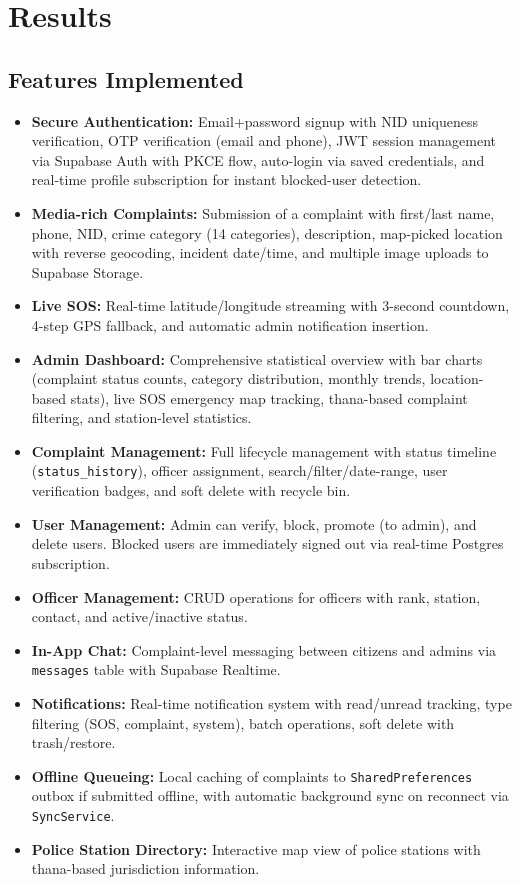 \documentclass[12pt, a4paper, twoside]{report}
\begin{document}
\chapter{Results}
\section{Features Implemented}
\begin{itemize}[label={}, itemsep=1em]
    \item \textbf{Secure Authentication:} Email+password signup with NID uniqueness verification, OTP verification (email and phone), JWT session management via Supabase Auth with PKCE flow, auto-login via saved credentials, and real-time profile subscription for instant blocked-user detection.
    \item \textbf{Media-rich Complaints:} Submission of a complaint with first/last name, phone, NID, crime category (14 categories), description, map-picked location with reverse geocoding, incident date/time, and multiple image uploads to Supabase Storage.
    \item \textbf{Live SOS:} Real-time latitude/longitude streaming with 3-second countdown, 4-step GPS fallback, and automatic admin notification insertion.
    \item \textbf{Admin Dashboard:} Comprehensive statistical overview with bar charts (complaint status counts, category distribution, monthly trends, location-based stats), live SOS emergency map tracking, thana-based complaint filtering, and station-level statistics.
    \item \textbf{Complaint Management:} Full lifecycle management with status timeline (\texttt{status\_history}), officer assignment, search/filter/date-range, user verification badges, and soft delete with recycle bin.
    \item \textbf{User Management:} Admin can verify, block, promote (to admin), and delete users. Blocked users are immediately signed out via real-time Postgres subscription.
    \item \textbf{Officer Management:} CRUD operations for officers with rank, station, contact, and active/inactive status.
    \item \textbf{In-App Chat:} Complaint-level messaging between citizens and admins via \texttt{messages} table with Supabase Realtime.
    \item \textbf{Notifications:} Real-time notification system with read/unread tracking, type filtering (SOS, complaint, system), batch operations, soft delete with trash/restore.
    \item \textbf{Offline Queueing:} Local caching of complaints to \texttt{SharedPreferences} outbox if submitted offline, with automatic background sync on reconnect via \texttt{SyncService}.
    \item \textbf{Police Station Directory:} Interactive map view of police stations with thana-based jurisdiction information.
\end{itemize}
\end{document}
